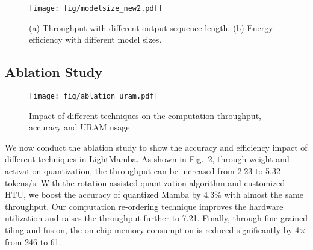\begin{figure}[t]
    \centering
   \vspace{-10pt} \texttt{[image: fig/modelsize\_new2.pdf]}
    \caption{
    (a) Throughput with different output sequence length.
    (b) Energy efficiency with different model sizes.
    }
    \label{fig: model size}
\end{figure}




\subsection{Ablation Study}
\label{subsec:Ablation Study}

\begin{figure}[t]
    \centering
    \texttt{[image: fig/ablation\_uram.pdf]}
    \caption{Impact of different techniques on the computation throughput, accuracy and URAM usage.}
    \vspace{-10pt}
    \label{fig:ablation}
\end{figure}

We now conduct the ablation study to show the accuracy and efficiency impact of different techniques in LightMamba.
As shown in Fig.~\ref{fig:ablation}, through weight and activation quantization, the throughput can be increased
from 2.23 to 5.32 tokens/s. With the rotation-assisted quantization algorithm and customized HTU, we
boost the accuracy of quantized Mamba by 4.3\% with almost the same throughput. 
Our computation re-ordering technique
improves the hardware utilization and raises the throughput further to 7.21.
Finally, through fine-grained tiling and fusion, the on-chip memory consumption is reduced significantly by 
4$\times$ from 246 to 61.

